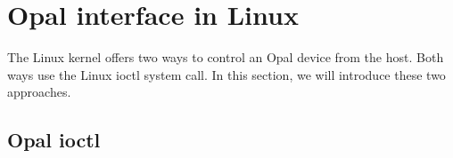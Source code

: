 


\chapter{Opal interface in Linux}

The Linux kernel offers two ways to control an Opal device from the host. Both ways use the Linux ioctl system call. In this section, we will introduce these two approaches.


\section{Opal ioctl}
\label{section:opal_opal_ioctl}

